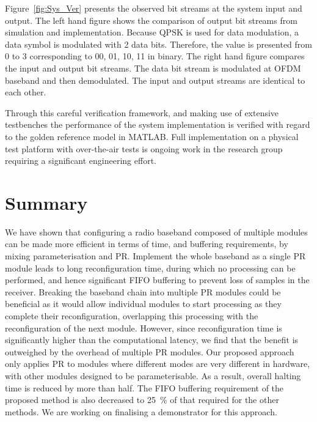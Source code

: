 Figure~\ref{fig:Sys_Ver} presents the observed bit streams at the system input and output. The left hand figure shows the comparison of output bit streams from simulation and implementation. Because QPSK is used for data modulation, a data symbol is modulated with 2 data bits. Therefore, the value is presented from 0 to 3 corresponding to 00, 01, 10, 11 in binary. The right hand figure compares the input and output bit streams. The data bit stream is modulated at OFDM baseband and then demodulated. The input and output streams are identical to each other.

Through this careful verification framework, and making use of extensive testbenches the performance of the system implementation is verified with regard to the golden reference model in MATLAB.
Full implementation on a physical test platform with over-the-air tests is ongoing work in the research group requiring a significant engineering effort.

\section{Summary}
We have shown that configuring a radio baseband composed of multiple modules can be made more efficient in terms of time, and buffering requirements, by mixing parameterisation and PR.
Implement the whole baseband as a single PR module leads to long reconfiguration time, during which no processing can be performed, and hence significant FIFO buffering to prevent loss of samples in the receiver.
Breaking the baseband chain into multiple PR modules could be beneficial as it would allow individual modules to start processing as they complete their reconfiguration, overlapping this processing with the reconfiguration of the next module. However, since reconfiguration time is significantly higher than the computational latency, we find that the benefit is outweighed by the overhead of multiple PR modules.
Our proposed approach only applies PR to modules where different modes are very different in hardware, with other modules designed to be parameterisable. As a result, overall halting time is reduced by more than half.
The FIFO buffering requirement of the proposed method is also decreased to 25~\% of that required for the other methods.
We are working on finalising a demonstrator for this approach.